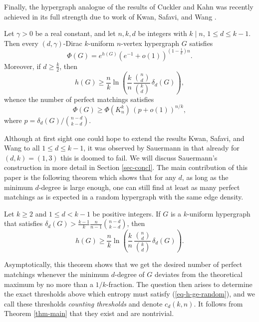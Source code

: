 \documentclass[11pt]{article}
\begin{document}
Finally, the hypergraph analogue of the results of Cuckler and Kahn was recently achieved in its full strength due to work of Kwan, Safavi, and Wang \cite{kwan2026counting}.

\begin{theorem}\label{thm-kwan}
    Let $\gamma>0$ be a real constant, and let $n,k,d$ be integers with $k\mid n$, $1\le d\le k-1$. Then every $(d,\gamma)$-Dirac $k$-uniform $n$-vertex hypergraph $G$ satisfies
    \begin{equation}\label{eq-phi-entropy}
        \Phi(G)=e^{h(G)}\left(e^{-1}+o(1)\right)^{\left(1-\frac{1}{k}\right)n}.
    \end{equation}
    Moreover, if $d\ge \frac{k}{2}$, then
    \begin{equation}\label{eq-h-ge-random}
        h(G)\ge\frac{n}{k}\ln\left(\frac{k}{n}\,\frac{\binom{n}{d}}{\binom{k}{d}}\,\delta_d(G)\right),
    \end{equation}
    whence the number of perfect matchings satisfies
    \begin{equation}\label{eq-phi-ge-random}
        \Phi(G)\ge\Phi(K^k_n)\,(p+o(1))^{n/k},
    \end{equation}
    where $p=\delta_d(G)/\binom{n-d}{k-d}$.
\end{theorem}

Although at first sight one could hope to extend the results Kwan, Safavi, and Wang to all $1\le d\le k-1$, it was observed by Sauermann in \cite[Section 5]{ferber2023counting} that already for $(d,k)=(1,3)$ this is doomed to fail. We will discuss Sauermann's construction in more detail in Section \ref{sec-concl}. The main contribution of this paper is the following theorem which shows that for any $d$, as long as the minimum $d$-degree is large enough, one can still find at least as many perfect matchings as is expected in a random hypergraph with the same edge density.

\begin{theorem}\label{thm-main}
    Let $k\ge2$ and $1\le d< k-1$ be positive integers. If $G$ is a $k$-uniform hypergraph that satisfies $\delta_d(G)> \frac{k-1}{k}\frac{n}{n-1}\binom{n-d}{k-d}$, then
    $$h(G)\ge\frac{n}{k}\ln\left(\frac{k}{n}\,\frac{\binom{n}{d}}{\binom{k}{d}}\,\delta_d(G)\right).$$
\end{theorem}

Asymptotically, this theorem shows that we get the desired number of perfect matchings whenever the minimum $d$-degree of $G$ deviates from the theoretical maximum by no more than a $1/k$-fraction. The question then arises to determine the exact thresholds above which entropy must satisfy (\ref{eq-h-ge-random}), and we call these thresholds \emph{counting thresholds} and denote $c_d(k,n)$. It follows from Theorem \ref{thm-main} that they exist and are nontrivial.
\end{document}
